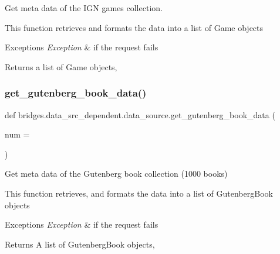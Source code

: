 Get meta data of the I\+GN games collection. 

This function retrieves and formats the data into a list of Game objects


\begin{DoxyExceptions}{Exceptions}
{\em Exception} & if the request fails\\
\hline
\end{DoxyExceptions}
\begin{DoxyReturn}{Returns}
a list of Game objects, 
\end{DoxyReturn}
\mbox{\label{namespacebridges_1_1data__src__dependent_1_1data__source_af377da50c8f4e488b832978908274089}} 
\subsubsection{\texorpdfstring{get\+\_\+gutenberg\+\_\+book\+\_\+data()}{get\_gutenberg\_book\_data()}}
{\footnotesize\ttfamily def bridges.\+data\+\_\+src\+\_\+dependent.\+data\+\_\+source.\+get\+\_\+gutenberg\+\_\+book\+\_\+data (\begin{DoxyParamCaption}\item[{}]{num = {} }\end{DoxyParamCaption})}



Get meta data of the Gutenberg book collection (1000 books) 

This function retrieves, and formats the data into a list of Gutenberg\+Book objects


\begin{DoxyExceptions}{Exceptions}
{\em Exception} & if the request fails\\
\hline
\end{DoxyExceptions}
\begin{DoxyReturn}{Returns}
A list of Gutenberg\+Book objects, 
\end{DoxyReturn}
\mbox{\label{namespacebridges_1_1data__src__dependent_1_1data__source_aa0596e45a60ae4cc26f3dd11c88e16e6}} 
